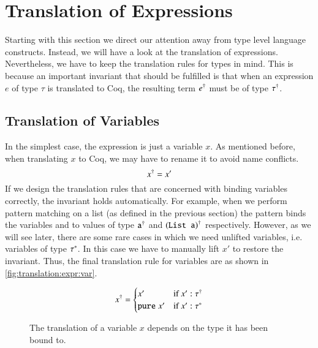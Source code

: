 \section{Translation of Expressions} \label{sec:translation:expr}
Starting with this section we direct our attention away from type level language constructs.
Instead, we will have a look at the translation of expressions.
Nevertheless, we have to keep the translation rules for types in mind.
This is because an important invariant that should be fulfilled is that when an expression $e$ of type $\tau$ is translated to Coq, the resulting term ${e}^{\dagger}$ must be of type ${\tau}^{\dagger}$.

\subsection{Translation of Variables} \label{sec:translation:expr:vars}
In the simplest case, the expression is just a variable $x$.
As mentioned before, when translating $x$ to Coq, we may have to rename it to avoid name conflicts.
\[
  {x}^{\dagger} = x'
\]
If we design the translation rules that are concerned with binding variables correctly, the invariant holds automatically.
For example, when we perform pattern matching on a list (as defined in the previous section) the pattern  binds the variables  and  to values of type ${\texttt{a}}^{\dagger}$ and ${(\texttt{List a})}^{\dagger}$ respectively.
However, as we will see later, there are some rare cases in which we need unlifted variables, i.e. variables of type ${\tau}^{*}$.
In this case we have to manually lift $x'$ to restore the invariant.
Thus, the final translation rule for variables are as shown in \autoref{fig:translation:expr:var}.

\begin{figure}[H]
  \[
    {x}^{\dagger} = \begin{cases}
      x'        &\text{if } x' : {\tau}^{\dagger} \\
      \texttt{pure}\;{x'} &\text{if } x' : {\tau}^{*}
    \end{cases}
  \]
  \caption{The translation of a variable $x$ depends on the type it has been bound to.}
  \label{fig:translation:expr:var}
\end{figure}

